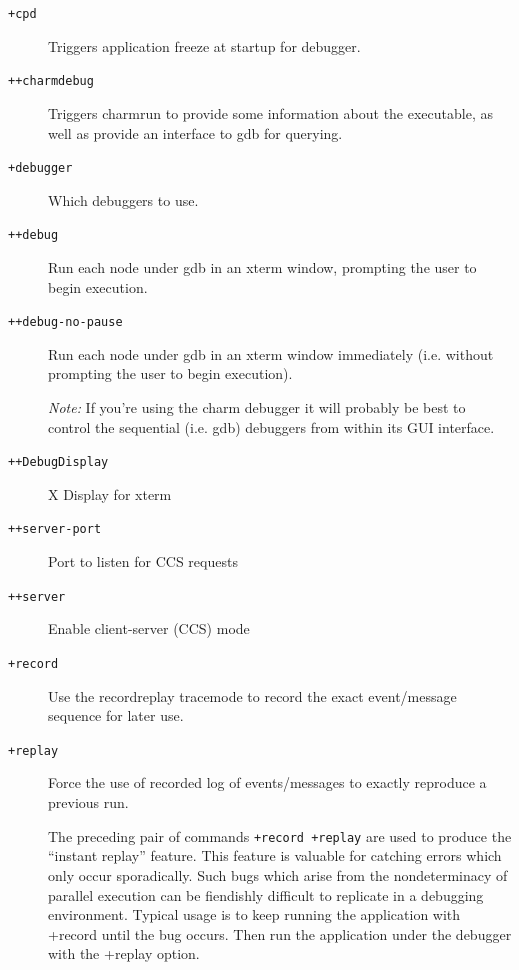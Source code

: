 \documentclass[10pt]{article}
\begin{document}
\begin{description}

\item[{\tt +cpd}] Triggers application freeze at startup for debugger.

\item[{\tt ++charmdebug}] Triggers charmrun to provide some information about the
executable, as well as provide an interface to gdb for querying.

\item[{\tt +debugger}] Which debuggers to use.

\item[{\tt ++debug}] Run each node under gdb in an xterm window, prompting
the user to begin execution.

\item[{\tt ++debug-no-pause}] Run each node under gdb in an xterm window
immediately (i.e. without prompting the user to begin execution).

 \emph{ Note: } If you're using the charm debugger it will probably be
 best to control the sequential (i.e. gdb) debuggers from within its
 GUI interface.
 
\item[{\tt ++DebugDisplay}]          X Display for xterm

\item[{\tt ++server-port}]      Port to listen for CCS requests

\item[{\tt ++server}]           Enable client-server (CCS) mode

\item[{\tt +record}]           Use the recordreplay tracemode to record the exact event/message sequence for later use.  

\item[{\tt +replay}]           Force the use of recorded log of events/messages  to exactly reproduce a previous run.

  The preceding pair of commands {\tt +record +replay} are used to
  produce the ``instant replay'' feature.  This feature is valuable
  for catching errors which only occur sporadically.  Such bugs which
  arise from the nondeterminacy of parallel execution can be
  fiendishly difficult to replicate in a debugging environment.
  Typical usage is to keep running the application with +record until
  the bug occurs.  Then run the application under the debugger with
  the +replay option.

\end{description}
\end{document}
